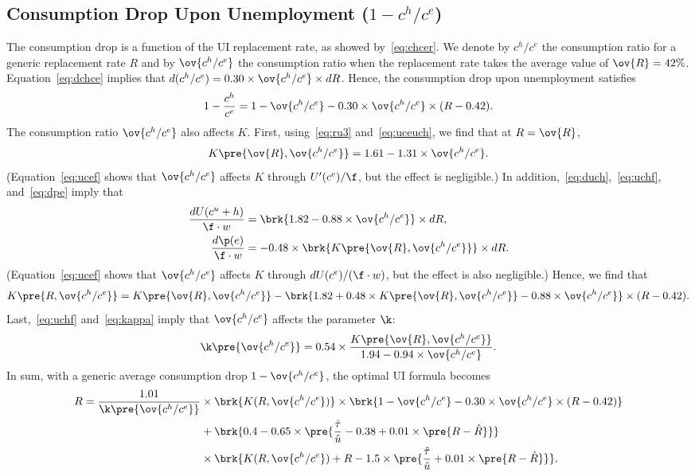 \documentclass[letterpaper,12pt,leqno]{article}
\begin{document}
\subsection{Consumption Drop Upon Unemployment ($1-c^{h}/c^{e}$)}

The consumption drop is a function of the UI replacement rate, as showed by~\eqref{eq:chcer}. We denote by $c^{h}/c^{e}$ the consumption ratio for a generic replacement rate $R$ and by $\ov{c^{h}/c^{e}}$ the consumption ratio when the replacement rate takes the average value of $\ov{R}=42\%$. Equation~\eqref{eq:dchce} implies that $d(c^{h}/c^{e})=0.30 \times \ov{c^{h}/c^{e}} \times dR$. Hence, the consumption drop upon unemployment satisfies
\begin{equation*}
1-\frac{c^{h}}{c^{e}}=1-\ov{c^{h}/c^{e}}-0.30\times \ov{c^{h}/c^{e}} \times (R-0.42).
\end{equation*}
The consumption ratio $\ov{c^{h}/c^{e}}$ also affects $K$. First, using~\eqref{eq:ru3} and~\eqref{eq:uceuch}, we find that at $R=\ov{R}$,
\begin{equation*}
K\pre{\ov{R},\ov{c^{h}/c^{e}}}=1.61-1.31\times\ov{c^{h}/c^{e}}.
\end{equation*}
(Equation~\eqref{eq:ucef} shows that $\ov{c^{h}/c^{e}}$ affects $K$ through $U'(c^{e})/\f$, but the effect is negligible.) In addition,~\eqref{eq:duch},~\eqref{eq:uchf}, and~\eqref{eq:dpe} imply that
\begin{align*}
\frac{dU(c^{u}+h)}{\f\cdot w} &= \brk{1.82-0.88\times \ov{c^{h}/c^{e}}}\times dR,\\
\frac{d\p(e)}{\f\cdot w} & = - 0.48\times \brk{K\pre{\ov{R},\ov{c^{h}/c^{e}}}}\times dR.
\end{align*} 
(Equation~\eqref{eq:ucef} shows that $\ov{c^h/c^e}$ affects $K$ through $dU(c^e)/(\f\cdot w)$, but the effect is also negligible.) Hence, we find that
\begin{equation*}
K\pre{R,\ov{c^{h}/c^{e}}} = K\pre{\ov{R},\ov{c^{h}/c^{e}}}-\brk{1.82 +0.48\times K\pre{\ov{R},\ov{c^{h}/c^{e}}}- 0.88\times \ov{c^{h}/c^{e}}}\times (R-0.42).
\end{equation*}
Last,~\eqref{eq:uchf} and~\eqref{eq:kappa} imply that $\ov{c^{h}/c^{e}}$ affects the parameter $\k$:
\begin{equation*}
\k\pre{\ov{c^{h}/c^{e}}}=0.54\times \frac{K\pre{\ov{R},\ov{c^{h}/c^{e}}}}{1.94-0.94\times\ov{c^{h}/c^{e}}}.
\end{equation*} 
In sum, with a generic average consumption drop $1-\ov{c^{h}/c^{e}}$, the optimal UI formula becomes
\begin{align*}
R = \frac{1.01}{\k\pre{\ov{c^{h}/c^{e}}}}  &  \times\brk{K(R,\ov{c^{h}/c^{e}})} \times \brk{1-\ov{c^{h}/c^{e}}-0.30 \times \ov{c^{h}/c^{e}} \times (R-0.42)}\\
&+\brk{0.4 - 0.65 \times \pre{\frac{\hat{\tau}}{\hat{u}}-0.38+ 0.01 \times \pre{R-\hat{R}}}}\\
&\times\brk{K(R,\ov{c^{h}/c^{e}})+ R - 1.5 \times \pre{\frac{\hat{\tau}}{\hat{u}}+ 0.01 \times \pre{R-\hat{R}}}}.
\end{align*}
\end{document}
